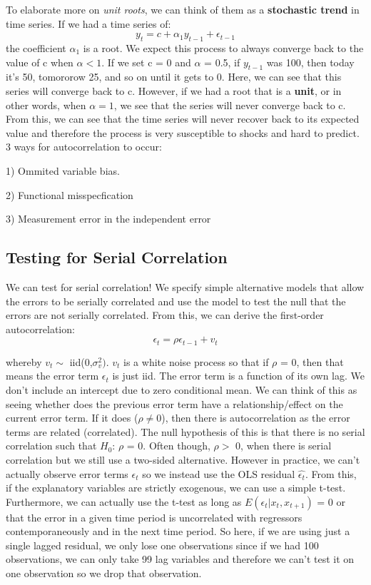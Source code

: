\documentclass[11pt, oneside]{article}
\theoremstyle{definition}
\begin{document}
To elaborate more on \textit{unit roots}, we can think of them as a \textbf{stochastic trend} in time series. If we had a time series of:
$$
y_t = c + \alpha_1y_{t-1} + \epsilon_{t-1}
$$
the coefficient $\alpha_1$ is a root. We expect this process to always converge back to the value of c when $\alpha < 1$. If we set c = 0 and $\alpha$ = 0.5, if $y_{t-1}$ was 100, then today it's 50, tomororow 25, and so on until it gets to 0. Here, we can see that this series will converge back to c. However, if we had a root that is a \textbf{unit}, or in other words, when $\alpha = 1$, we see that the series will never converge back to c. From this, we can see that the time series will never recover back to its expected value and therefore the process is very susceptible to shocks and hard to predict. 3 ways for autocorrelation to occur:

1) Ommited variable bias.

2) Functional misspecfication

3) Measurement error in the independent error

\subsection{Testing for Serial Correlation}
We can test for serial correlation! We specify simple alternative models that allow the errors to be serially correlated and use the model to test the null that the errors are not serially correlated. From this, we can derive the first-order autocorrelation:
$$
\epsilon_t = \rho \epsilon_{t-1} + v_t
$$

whereby $v_t \sim $ iid(0,$\sigma_v^2)$. $v_t$ is a white noise process so that if $\rho$ = 0, then that means the error term $\epsilon_t$ is just iid. The error term is a function of its own lag. We don't include an intercept due to zero conditional mean. We can think of this as seeing whether does the previous error term have a relationship/effect on the current error term. If it does ($\rho \neq 0$), then there is autocorrelation as the error terms are related (correlated). The null hypothesis of this is that there is no serial correlation such that $H_0$: $\rho$ = 0. Often though, $\rho >$ 0, when there is serial correlation but we still use a two-sided alternative. However in practice, we can't actually observe error terms $\epsilon_t$ so we instead use the OLS residual $\hat{\epsilon_t}$. From this, if the explanatory variables are strictly exogenous, we can use a simple t-test. Furthermore, we can actually use the t-test as long as $E(\epsilon_t | x_t, x_{t+1})$ = 0 or that the error in a given time period is uncorrelated with regressors contemporaneously and in the next time period. So here, if we are using just a single lagged residual, we only lose one observations since if we had 100 observations, we can only take 99 lag variables and therefore we can't test it on one observation so we drop that observation.
\end{document}

